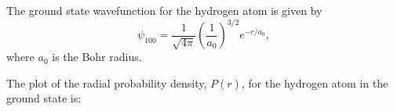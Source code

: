  \iffalse
    \title{Assignment}
    \author{EE24BTECH11035}
    \section{ph}
    \chapter{2012}
  \fi

   \item The ground state wavefunction for the hydrogen atom is given by 
  \begin{equation*}
     \psi_{100} = \frac{1}{\sqrt{4 \pi}} \left(\frac{1}{a_0}\right)^{3/2} e^{-r/a_0},  
  \end{equation*}  
    where $a_0$ is the Bohr radius.

    The plot of the radial probability density, $P(r)$, for the hydrogen atom in the ground state is:
    
